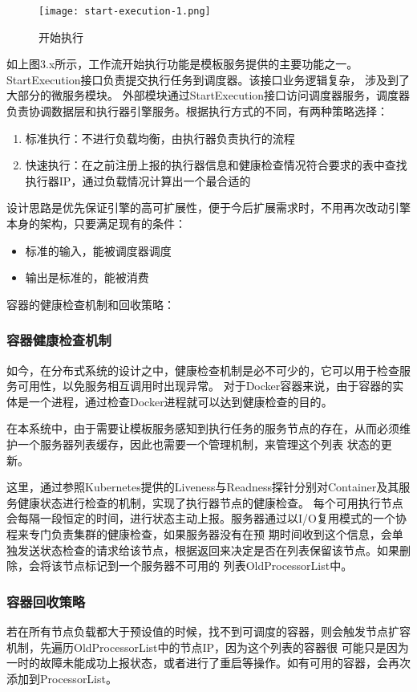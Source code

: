 \begin{figure}[H]
\centering
\texttt{[image: start-execution-1.png]}
\caption{开始执行}
\label{fig:kszx}
\end{figure}

如上图3.x所示，工作流开始执行功能是模板服务提供的主要功能之一。StartExecution接口负责提交执行任务到调度器。该接口业务逻辑复杂，
涉及到了大部分的微服务模块。 外部模块通过StartExecution接口访问调度器服务，调度器负责协调数据层和执行器引擎服务。根据执行方式的不同，有两种策略选择：

\begin{enumerate}
    \item 标准执行：不进行负载均衡，由执行器负责执行的流程
    \item 快速执行：在之前注册上报的执行器信息和健康检查情况符合要求的表中查找执行器IP，通过负载情况计算出一个最合适的
\end{enumerate}


设计思路是优先保证引擎的高可扩展性，便于今后扩展需求时，不用再次改动引擎本身的架构，只要满足现有的条件：
\begin{itemize}
    \item 标准的输入，能被调度器调度
    \item 输出是标准的，能被消费
\end{itemize}

容器的健康检查机制和回收策略：
\subsubsection{容器健康检查机制}

如今，在分布式系统的设计之中，健康检查机制是必不可少的，它可以用于检查服务可用性，以免服务相互调用时出现异常。
对于Docker容器来说，由于容器的实体是一个进程，通过检查Docker进程就可以达到健康检查的目的\cite{zw1}。

在本系统中，由于需要让模板服务感知到执行任务的服务节点的存在，从而必须维护一个服务器列表缓存，因此也需要一个管理机制，来管理这个列表
状态的更新。

这里，通过参照Kubernetes提供的Liveness与Readness探针分别对Container及其服务健康状态进行检查的机制\cite{wfwr442}，实现了执行器节点的健康检查。
每个可用执行节点会每隔一段恒定的时间，进行状态主动上报。服务器通过以I/O复用模式的一个协程来专门负责集群的健康检查，如果服务器没有在预
期时间收到这个信息，会单独发送状态检查的请求给该节点，根据返回来决定是否在列表保留该节点。如果删除，会将该节点标记到一个服务器不可用的
列表OldProcessorList中\cite{zw2}。

\subsubsection{容器回收策略}
若在所有节点负载都大于预设值的时候，找不到可调度的容器，则会触发节点扩容机制，先遍历OldProcessorList中的节点IP，因为这个列表的容器很
可能只是因为一时的故障未能成功上报状态，或者进行了重启等操作。如有可用的容器，会再次添加到ProcessorList\cite{lamprecht2021reinforcement}。

